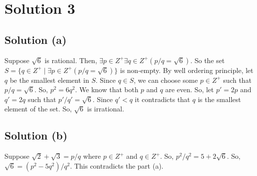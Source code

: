 \documentclass{article}
\begin{document}
\section{Solution 3}
\subsection{Solution (a)}
Suppose $\sqrt{6}$ is rational. Then, $\exists p \in Z^{+} \exists q \in Z^{+}(p/q = \sqrt{6})$. So the set $S = \{q \in Z^{+} \mid \exists p \in Z^{+}(p/q = \sqrt{6})\}$ is non-empty. By well ordering principle, let $q$ be the smallest element in $S$. Since $q \in S$, we can choose some $p \in Z^{+}$ such that $p/q = \sqrt{6}$. So, $p^2 = 6q^2$. We know that both $p$ and $q$ are even. So, let $p' = 2p$ and $q' = 2q$ such that $p'/q' = \sqrt{6}$. Since $q' < q$ it contradicts that $q$ is the smallest element of the set. So, $\sqrt{6}$ is irrational.

\subsection{Solution (b)}
Suppose $\sqrt{2} + \sqrt{3} = p/q$ where $p \in Z^{+}$ and $q \in Z^{+}$. So, $p^2 / q^2 = 5 + 2\sqrt{6}$. So, $\sqrt{6} = (p^2 - 5q^2)/q^2$. This contradicts the part (a).
\end{document}
